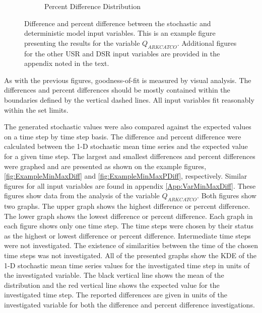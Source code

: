 \begin{linenumbers}
\begin{figure}[htbp]
\begin{subfigure}{0.5\textwidth}
		\caption{Percent Difference Distribution}
		\label{sub:pdiff}
	\end{subfigure}
	\caption[Difference and percent difference between the stochastic and deterministic model input variables.]{Difference and percent difference between the stochastic and deterministic model input variables.  This is an example figure presenting the results for the variable $Q_{ARKCATCO}$.  Additional figures for the other USR and DSR input variables are provided in the appendix noted in the text.}
	\label{fig:ExampleDifference}
\end{figure}

As with the previous figures, goodness-of-fit is measured by visual analysis.  The differences and percent differences should be mostly contained within the boundaries defined by the vertical dashed lines.  All input variables fit reasonably within the set limits.

The generated stochastic values were also compared against the expected values on a time step by time step basis.  The difference and percent difference were calculated between the 1-D stochastic mean time series and the expected value for a given time step.  The largest and smallest differences and percent differences were graphed and are presented as shown on the example figures, \ref{fig:ExampleMinMaxDiff} and \ref{fig:ExampleMinMaxPDiff}, respectively.  Similar figures for all input variables are found in appendix \ref{App:VarMinMaxDiff}.  These figures show data from the analysis of the variable $Q_{ARKCATCO}$.  Both figures show two graphs.  The upper graph shows the highest difference or percent difference.  The lower graph shows the lowest difference or percent difference.  Each graph in each figure shows only one time step.  The time steps were chosen by their status as the highest or lowest difference or percent difference.  Intermediate time steps were not investigated.  The existence of similarities between the time of the chosen time steps was not investigated.  All of the presented graphs show the KDE of the 1-D stochastic mean time series values for the investigated time step in units of the investigated variable.  The black vertical line shows the mean of the distribution and the red vertical line shows the expected value for the investigated time step.  The reported differences are given in units of the investigated variable for both the difference and percent difference investigations.  


\end{linenumbers}
